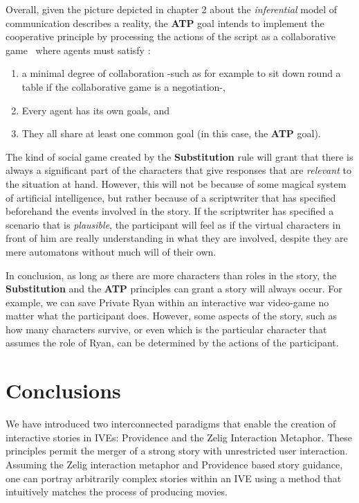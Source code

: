 \documentclass[
		twoside,openright,titlepage,numbers=noenddot,manychapters,
		headinclude,%
                footinclude=false,cleardoublepage=empty,
                BCOR=5mm,
		fontsize=11pt, %
                 enabledeprecatedfontcommands]{scrreprt}
\begin{document}
Overall, given the picture depicted in chapter 2 about the \emph{inferential} model of communication describes a reality,  the \textbf{ATP} goal intends to implement the cooperative principle \cite[]{grice200lac} by processing the actions of the script as a collaborative game \, where agents must satisfy \cite[chap 6, p.114]{luce1989gad}:
\begin{enumerate}
  \item a minimal degree of collaboration -such as for example to sit down round a table if the collaborative game is a negotiation-,
  \item Every agent has its own goals, and
  \item They all share at least one common goal (in this case, the \textbf{ATP} goal).
\end{enumerate}
The kind of social game created by the \textbf{Substitution} rule will grant that there is always a significant part of the characters that give responses that are \emph{relevant} \cite[]{sperber2004rt} to the situation at hand. However, this will not be because of some magical system of artificial intelligence, but rather because of  a scriptwriter that has specified beforehand the events involved in the story.  If the scriptwriter has specified a scenario that is \emph{plausible}, the participant will feel as if the virtual characters in front of him are really understanding in what they are involved, despite they are mere automatons without much will of their own.


In conclusion, as long as there are more characters than roles in the story, the \textbf{Substitution} and the \textbf{ATP} principles can grant a story will always occur. For example, we can save Private Ryan within an interactive war video-game no matter what the participant does. However, some aspects of the story, such as how many characters survive, or even which is the particular character that assumes the role of Ryan, can be determined by the actions of the participant.


\section{Conclusions}
We have introduced two interconnected paradigms that enable the creation of interactive stories in IVEs: Providence and the Zelig Interaction Metaphor. These principles permit the merger of a strong story with unrestricted user interaction. Assuming the Zelig interaction metaphor and Providence based story guidance, one can portray arbitrarily complex stories within an IVE using a method that intuitively matches the process of producing movies. 
\end{document}
